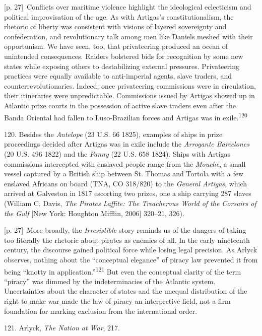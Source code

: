 \documentclass[10pt,a4paper]{article}
\begin{document}
{\scriptsize\color{gray} [p. 27]}\ Conflicts over maritime violence highlight the ideological eclecticism and political improvisation of the age. As with Artigas’s constitutionalism, the rhetoric of liberty was consistent with visions of layered sovereignty and confederation, and revolutionary talk among men like Daniels meshed with their opportunism. We have seen, too, that privateering produced an ocean of unintended consequences. Raiders bolstered bids for recognition by some new states while exposing others to destabilizing external pressures. Privateering practices were equally available to anti-imperial agents, slave traders, and counterrevolutionaries. Indeed, once privateering commissions were in circulation, their itineraries were unpredictable. Commissions issued by Artigas showed up in Atlantic prize courts in the possession of active slave traders even after the Banda Oriental had fallen to Luso-Brazilian forces and Artigas was in exile.\nobreak\textsuperscript{120}\par{\small 120. Besides the \textit{Antelope} (23 U.S. 66 1825), examples of ships in prize proceedings decided after Artigas was in exile include the \textit{Arrogante Barcelones} (20 U.S. 496 1822) and the \textit{Fanny} (22 U.S. 658 1824). Ships with Artigas commissions intercepted with enslaved people range from the \textit{Mouche}, a small vessel captured by a British ship between St. Thomas and Tortola with a few enslaved Africans on board (TNA, CO 318/820) to the \textit{General Artigas}, which arrived at Galveston in 1817 escorting two prizes, one a ship carrying 287 slaves (William C. Davis, \textit{The Pirates Laffite: The Treacherous World of the Corsairs of the Gulf} [New York: Houghton Mifflin, 2006] 320–21, 326).\par}
{\scriptsize\color{gray} [p. 27]}\ More broadly, the \textit{Irresistible} story reminds us of the dangers of taking too literally the rhetoric about pirates as enemies of all. In the early nineteenth century, the discourse gained political force while losing legal precision. As Arlyck observes, nothing about the “conceptual elegance” of piracy law prevented it from being “knotty in application.”\nobreak\textsuperscript{121} But even the conceptual clarity of the term “piracy” was dimmed by the indeterminacies of the Atlantic system. Uncertainties about the character of states and the unequal distribution of the right to make war made the law of piracy an interpretive field, not a firm foundation for marking exclusion from the international order.\par{\small 121. Arlyck, \textit{The Nation at War}, 217.\par}
\end{document}
